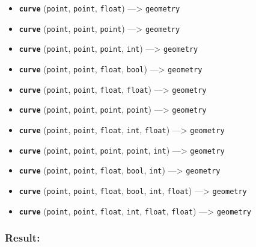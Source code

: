 \documentclass[]{book}
\providecommand{\tightlist}{%
  \setlength{\itemsep}{0pt}\setlength{\parskip}{0pt}}
\theoremstyle{definition}
\theoremstyle{definition}
\theoremstyle{definition}
\theoremstyle{remark}
\begin{document}
\begin{itemize}
\tightlist
\item
  \textbf{\texttt{curve}} (\texttt{point}, \texttt{point},
  \texttt{float}) ---\textgreater{} \texttt{geometry}
\item
  \textbf{\texttt{curve}} (\texttt{point}, \texttt{point},
  \texttt{point}) ---\textgreater{} \texttt{geometry}
\item
  \textbf{\texttt{curve}} (\texttt{point}, \texttt{point},
  \texttt{point}, \texttt{int}) ---\textgreater{} \texttt{geometry}
\item
  \textbf{\texttt{curve}} (\texttt{point}, \texttt{point},
  \texttt{float}, \texttt{bool}) ---\textgreater{} \texttt{geometry}
\item
  \textbf{\texttt{curve}} (\texttt{point}, \texttt{point},
  \texttt{float}, \texttt{float}) ---\textgreater{} \texttt{geometry}
\item
  \textbf{\texttt{curve}} (\texttt{point}, \texttt{point},
  \texttt{point}, \texttt{point}) ---\textgreater{} \texttt{geometry}
\item
  \textbf{\texttt{curve}} (\texttt{point}, \texttt{point},
  \texttt{float}, \texttt{int}, \texttt{float}) ---\textgreater{}
  \texttt{geometry}
\item
  \textbf{\texttt{curve}} (\texttt{point}, \texttt{point},
  \texttt{point}, \texttt{point}, \texttt{int}) ---\textgreater{}
  \texttt{geometry}
\item
  \textbf{\texttt{curve}} (\texttt{point}, \texttt{point},
  \texttt{float}, \texttt{bool}, \texttt{int}) ---\textgreater{}
  \texttt{geometry}
\item
  \textbf{\texttt{curve}} (\texttt{point}, \texttt{point},
  \texttt{float}, \texttt{bool}, \texttt{int}, \texttt{float})
  ---\textgreater{} \texttt{geometry}
\item
  \textbf{\texttt{curve}} (\texttt{point}, \texttt{point},
  \texttt{float}, \texttt{int}, \texttt{float}, \texttt{float})
  ---\textgreater{} \texttt{geometry}
\end{itemize}

\subsubsection{Result:}\label{result-118}
\end{document}
